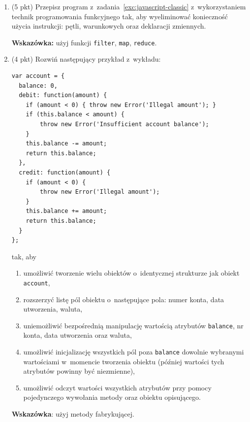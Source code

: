 \documentclass[12pt]{article}
\begin{document}
\begin{enumerate}
            Program należy napisać ,,klasycznie'', z~wykorzystaniem pętli \texttt{for} oraz instrukcji warunkowej.

            Przykładowe wyniki działania programu:
            \begin{multicols}{2}
                \begin{itemize}
                    \item $\emptyset\rightarrow$ \texttt{0}
                    \item \texttt{0} $\rightarrow$ \texttt{-1}
                    \item \texttt{1} $\rightarrow$ \texttt{2}
                    \item \texttt{1 2 3} $\rightarrow$ \texttt{7}
                \end{itemize}
            \end{multicols}
        \item
            (5 pkt) Przepisz program z~zadania~\ref{exc:javascript-classic} z~wykorzystaniem technik programowania funkcyjnego tak, aby wyeliminować konieczność użycia instrukcji: pętli, warunkowych oraz deklaracji zmiennych.

            \textbf{Wskazówka:} użyj funkcji \texttt{filter}, \texttt{map}, \texttt{reduce}.
        \item
            (4 pkt) Rozwiń następujący przykład z~wykładu:
            \begin{verbatim}
var account = {
  balance: 0,
  debit: function(amount) {
    if (amount < 0) { throw new Error('Illegal amount'); }
    if (this.balance < amount) {
        throw new Error('Insufficient account balance');
    }
    this.balance -= amount;
    return this.balance;
  },
  credit: function(amount) {
    if (amount < 0) {
        throw new Error('Illegal amount');
    }
    this.balance += amount;
    return this.balance;
  }
};
            \end{verbatim}
            tak, aby
            \begin{enumerate}
                \item umożliwić tworzenie wielu obiektów o~identycznej strukturze jak obiekt \texttt{account},
                \item rozszerzyć listę pól obiektu o~następujące pola: numer konta, data utworzenia, waluta,
                \item uniemożliwić bezpośrednią manipulację wartością atrybutów \texttt{balance}, nr konta, data utworzenia oraz waluta,
                \item umożliwić inicjalizację wszystkich pól poza \texttt{balance} dowolnie wybranymi wartościami w~momencie tworzenia obiektu (później wartości tych atrybutów powinny być niezmienne),
                \item umożliwić odczyt wartości wszystkich atrybutów przy pomocy pojedynczego wywołania metody oraz obiektu opisującego.
            \end{enumerate}
            \textbf{Wskazówka}: użyj metody fabrykującej.
    \end{enumerate}
\end{document}
